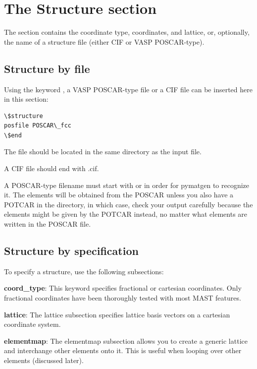 \documentclass[letterpaper,10pt,english]{sphinxmanual}
\begin{document}
\section{The Structure section}
\label{3_0_inputfile:the-structure-section}
The  section contains the coordinate type, coordinates, and lattice, or, optionally, the name of a structure file (either CIF or VASP POSCAR-type).


\subsection{Structure by file}
\label{3_0_inputfile:structure-by-file}
Using the keyword , a VASP POSCAR-type file or a CIF file can be inserted here in this section:

\begin{Verbatim}[commandchars=\\\{\}]
\$structure
posfile POSCAR\_fcc
\$end
\end{Verbatim}

The file should be located in the same directory as the input file.

A CIF file should end with .cif.

A POSCAR-type filename must start with  or  in order for pymatgen to recognize it. The elements will be obtained from the POSCAR unless you also have a POTCAR in the directory, in which case, check your output carefully because the elements might be given by the POTCAR instead, no matter what elements are written in the POSCAR file.


\subsection{Structure by specification}
\label{3_0_inputfile:structure-by-specification}
To specify a structure, use the following subsections:

\textbf{coord\_type}: This keyword specifies fractional or cartesian coordinates. Only fractional coordinates have been thoroughly tested with most MAST features.

\textbf{lattice}: The lattice subsection specifies lattice basis vectors on a cartesian coordinate system.

\textbf{elementmap}: The elementmap subsection allows you to create a generic lattice and interchange other elements onto it. This is useful when looping over other elements (discussed later).
\end{document}
